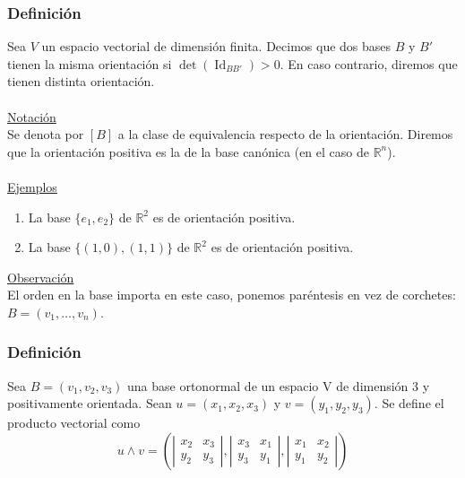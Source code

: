\documentclass[12pt, a4paper, ones, notitlepage, openany,titlepage]{article}
\begin{document}
\subsubsection{Definición}
Sea $V$ un espacio vectorial de dimensión finita. Decimos que dos bases $B$ y $B'$ tienen la misma orientación si $\operatorname{det}(\operatorname{Id}_{BB'})>0$. En caso contrario, diremos que tienen distinta orientación.\\\\
\underline{Notación}\\
Se denota por $[B]$ a la clase de equivalencia respecto de la orientación. Diremos que la orientación positiva es la de la base canónica (en el caso de $\mathbb{R}^n$).\\\\
\underline{Ejemplos}\\
\begin{enumerate}
	\item La base $\{e_1,e_2\}$ de $\mathbb{R}^2$ es de orientación positiva.
	\item La base $\{(1,0),(1,1)\}$ de $\mathbb{R}^2$ es de orientación positiva.
\end{enumerate}
\underline{Observación}\\
El orden en la base importa en este caso, ponemos paréntesis en vez de corchetes: $B=(v_1,\ldots,v_n)$.

\subsubsection{Definición}
Sea $B = (v_1,v_2,v_3)$ una base ortonormal de un espacio V de dimensión $3$ y positivamente orientada. Sean $u = (x_1,x_2,x_3)$ y $v = (y_1,y_2,y_3)$. Se define el producto vectorial como
$$
u \wedge v = \left(\left|
\begin{matrix}
	x_2 & x_3 \\
	y_2 & y_3
\end{matrix}
\right| , \left|
\begin{matrix}
	x_3 & x_1 \\
	y_3 & y_1
\end{matrix}
\right| , \left|
\begin{matrix}
	x_1 & x_2 \\
	y_1 & y_2
\end{matrix}
\right|
\right)
$$
\end{document}
